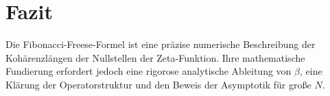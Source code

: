\documentclass[a4paper,12pt]{article}
\begin{document}
\section{Fazit}
Die Fibonacci-Freese-Formel ist eine präzise numerische Beschreibung der Kohärenzlängen der Nullstellen der Zeta-Funktion. Ihre mathematische Fundierung erfordert jedoch eine rigorose analytische Ableitung von $\beta$, eine Klärung der Operatorstruktur und den Beweis der Asymptotik für große $N$.
\end{document}
